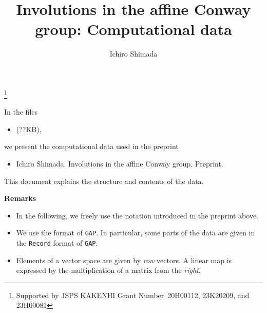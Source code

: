 \documentclass{amsart} %
\begin{document}
\title[[Involutions in the affine Conway group: Computational data]
{Involutions in the affine Conway group: Computational data}


\author{Ichiro Shimada}
\address{Department of Mathematics,
Graduate School of Science,
Hiroshima University,
1-3-1 Kagamiyama,
Higashi-Hiroshima,
739-8526 JAPAN}
\thanks{Supported by JSPS KAKENHI Grant Number~20H00112, 23K20209, and 23H00081}

\maketitle
%
%
% 
In the  files
\begin{itemize}
\item[]   (??KB), 
\end{itemize}
 we present  the computational data used in the preprint 
\begin{itemize}
\item []
Ichiro Shimada.  Involutions in the affine {C}onway group. Preprint.
  \end{itemize}
This document explains the structure and contents of the data.
%
\par
{\bf Remarks}
\begin{itemize}
\item
In the following, we freely use the notation introduced in the preprint above.
\item
We use the format of {\tt GAP}.
In particular, 
some parts of the data are given in  the {\tt Record} format of {\tt GAP}.
\item
Elements of a vector space are given by \emph{row} vectors.
A linear map is expressed by the multiplication of a matrix from the \emph{right}.
\end{itemize}
%
\end{document}
